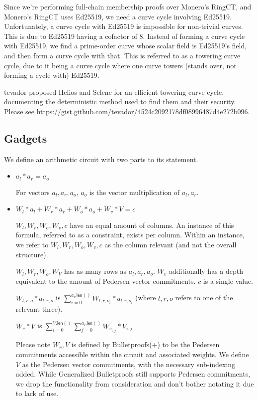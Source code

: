 \documentclass[]{article}
\begin{document}
Since we're performing full-chain membership proofs over Monero's RingCT, and Monero's RingCT uses Ed25519, we need a curve cycle involving Ed25519. Unfortunately, a curve cycle with Ed25519 is impossible for non-trivial curves. This is due to Ed25519 having a cofactor of 8. Instead of forming a curve cycle with Ed25519, we find a prime-order curve whose scalar field is Ed25519's field, and then form a curve cycle with that. This is referred to as a towering curve cycle, due to it being a curve cycle where one curve towers (stands over, not forming a cycle with) Ed25519.

tevador proposed Helios and Selene for an efficient towering curve cycle, documenting the deterministic method used to find them and their security. Please see https://gist.github.com/tevador/4524c2092178df08996487d4e272b096.

\newpage

\subsection{Gadgets}

We define an arithmetic circuit with two parts to its statement.

\begin{itemize}
	\item
	$a_l * a_r = a_o$
	
	For vectors $a_l, a_r, a_o$, $a_o$ is the vector multiplication of $a_l, a_r$.
	\item
	$W_l * a_l + W_r * a_r + W_o * a_o + W_v * V = c$
	
	$W_l, W_r, W_o, W_v, c$ have an equal amount of columns. An instance of this formula, referred to as a constraint, exists per column. Within an instance, we refer to $W_l, W_r, W_o, W_v, c$ as the column relevant (and not the overall structure).
	
	$W_l, W_r, W_o, W_V$ has as many rows as $a_l, a_r, a_o$. $W_v$ additionally has a depth equivalent to the amount of Pedersen vector commitments. $c$ is a single value.
	
    $W_{l,r,o} * a_{l,r,o}$ is $\sum^{a_l\mathsf{.len}()}_{i=0} W_{l,r,o_i} * a_{l,r,o_i}$ (where $l,r,o$ refers to one of the relevant three).
	
	$W_v * V$ is $\sum^{V\mathsf{.len}()}_{i=0} \sum^{a_l\mathsf{.len}()}_{j=0} W_{v_{i, j}} * V_{i, j}$

	Please note $W_v, V$ is defined by Bulletproofs(+) to be the Pedersen commitments accessible within the circuit and associated weights. We define $V$ as the Pedersen vector commitments, with the necessary sub-indexing added. While Generalized Bulletproofs still supports Pedersen commitments, we drop the functionality from consideration and don't bother notating it due to lack of use.
\end{itemize}
\end{document}
